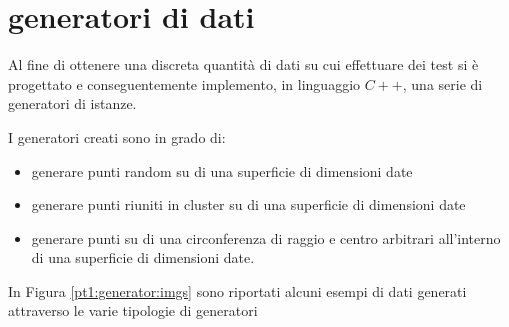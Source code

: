 %
%
\section{generatori di dati}
\label{pt1:generator}
Al fine di ottenere una discreta quantità di dati su cui effettuare dei test si è progettato e conseguentemente implemento, in linguaggio $C++$,
una serie di generatori di istanze.

I generatori creati sono in grado di:

\begin{itemize}
\item generare punti random su di una superficie di dimensioni date
\item generare punti riuniti in cluster su di una superficie di dimensioni date
\item generare punti su di una circonferenza di raggio e centro arbitrari all'interno di una superficie di dimensioni date.
\end{itemize}

In Figura \ref{pt1:generator:imgs} sono riportati alcuni esempi di dati generati attraverso le varie tipologie di generatori

